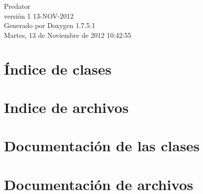 \documentclass[a4paper]{book}
\begin{document}
\hypersetup{pageanchor=false,citecolor=blue}
\begin{titlepage}
\vspace*{7cm}
\begin{center}
{\Large \-Predator \\[1ex]\large versión 1 13-\/\-N\-O\-V-\/2012 }\\
\vspace*{1cm}
{\large \-Generado por Doxygen 1.7.5.1}\\
\vspace*{0.5cm}
{\small Martes, 13 de Noviembre de 2012 10:42:55}\\
\end{center}
\end{titlepage}
\clearemptydoublepage
{}
\tableofcontents
\clearemptydoublepage
{}
\hypersetup{pageanchor=true,citecolor=blue}
\chapter{Índice de clases}

\chapter{\-Indice de archivos}

\chapter{\-Documentación de las clases}





\chapter{\-Documentación de archivos}





\printindex
\end{document}
